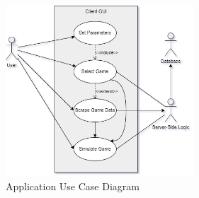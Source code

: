 \documentclass{thesis-ekf}
\theoremstyle{definition}
\theoremstyle{remark}
\begin{document}
\begin{figure}[th!]
	\centering
	\includegraphics[width=7cm]{img/usecase}
	\caption{Application Use Case Diagram}
	\label{img-usecase}
\end{figure}
\end{document}
